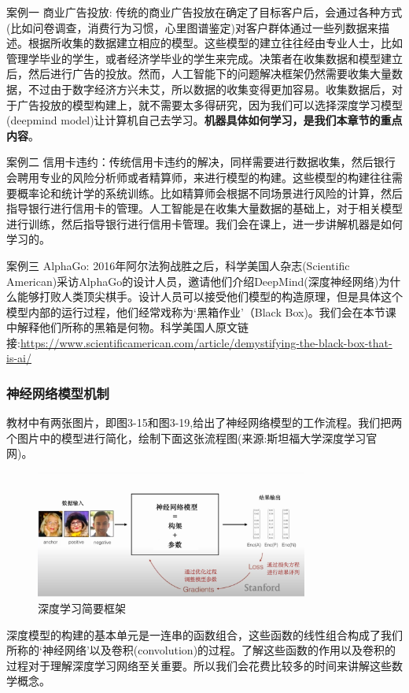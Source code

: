\documentclass[12pt]{article}
\newenvironment{fullmodel}{
			\smallskip\noindent
			\begin{minipage}{\textwidth+\marginparwidth+\marginparsep}\smallskip\smallskip}
			{\smallskip\smallskip\end{minipage}\vspace{.1in}
			}
\numberwithin{equation}{section}
\numberwithin{figure}{section}
\begin{document}

\noindent
\textcolor{deepramp}{案例一} 商业广告投放: 传统的商业广告投放在确定了目标客户后，会通过各种方式(比如问卷调查，消费行为习惯，心里图谱鉴定)对客户群体通过一些列数据来描述。根据所收集的数据建立相应的模型。这些模型的建立往往经由专业人士，比如管理学毕业的学生，或者经济学毕业的学生来完成。决策者在收集数据和模型建立后，然后进行广告的投放。然而，人工智能下的问题解决框架仍然需要收集大量数据，不过由于数字经济方兴未艾，所以数据的收集变得更加容易。收集数据后，对于广告投放的模型构建上，就不需要太多得研究，因为我们可以选择深度学习模型(deepmind model)让计算机自己去学习。\textbf{机器具体如何学习，是我们本章节的重点内容}。

\hfil

\noindent
\textcolor{deepramp}{案例二} 信用卡违约：传统信用卡违约的解决，同样需要进行数据收集，然后银行会聘用专业的风险分析师或者精算师，来进行模型的构建。这些模型的构建往往需要概率论和统计学的系统训练。比如精算师会根据不同场景进行风险的计算，然后指导银行进行信用卡的管理。人工智能是在收集大量数据的基础上，对于相关模型进行训练，然后指导银行进行信用卡管理。我们会在课上，进一步讲解机器是如何学习的。

\hfil

\noindent
\textcolor{deepramp}{案例三} AlphaGo: 2016年阿尔法狗战胜之后，科学美国人杂志(Scientific American)采访AlphaGo的设计人员，邀请他们介绍DeepMind(深度神经网络)为什么能够打败人类顶尖棋手。设计人员可以接受他们模型的构造原理，但是具体这个模型内部的运行过程，他们经常戏称为`黑箱作业'（Black Box)。我们会在本节课中解释他们所称的黑箱是何物。科学美国人原文链接:\url{https://www.scientificamerican.com/article/demystifying-the-black-box-that-is-ai/}


\subsubsection{神经网络模型机制}

\begin{fullmodel}
	教材中有两张图片，即图3-15和图3-19,给出了神经网络模型的工作流程。我们把两个图片中的模型进行简化，绘制下面这张流程图(来源:斯坦福大学深度学习官网)。
\begin{figure}[H]
	\centering
	\includegraphics[width=0.8\textwidth]{fig/deepmindflow}
	\caption{深度学习简要框架}
\end{figure}
深度模型的构建的基本单元是一连串的函数组合，这些函数的线性组合构成了我们所称的`神经网络'以及卷积(convolution)的过程。了解这些函数的作用以及卷积的过程对于理解深度学习网络至关重要。所以我们会花费比较多的时间来讲解这些数学概念。
\end{fullmodel}
\end{document}
